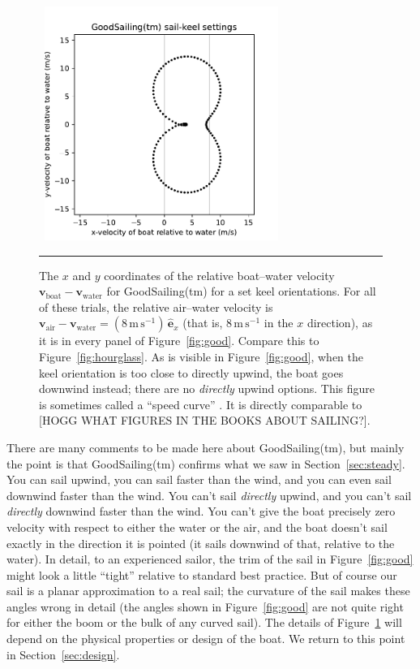 \documentclass[letterpaper]{article}
\renewcommand{\vec}[1]{\boldsymbol{#1}}
\newcommand{\uvec}{\vec{\hat{e}}}
\newcommand{\air}{\text{air}}
\newcommand{\water}{\text{water}}
\newcommand{\boat}{\text{boat}}
\newcommand{\vair}{\vec{v}_\air}
\newcommand{\vwater}{\vec{v}_\water}
\newcommand{\vboat}{\vec{v}_\boat}
\newcommand{\mps}{\mathrm{m\,s^{-1}}}
\newcommand{\secref}[1]{Section~\ref{#1}}
\newcommand{\figref}[1]{Figure~\ref{#1}}
\newcommand{\figurerule}{\rule[1ex]{\textwidth}{0.2pt}}
\begin{document}
\begin{figure}[t!]
  ~\hfill\includegraphics[width=3in]{hourglass-good.pdf}\hfill~
  \caption{The $x$ and $y$ coordinates of the relative boat--water velocity $\vboat-\vwater$ for GoodSailing(tm) for a set keel orientations.
  For all of these trials, the relative air--water velocity is $\vair-\vwater=(8\,\mps)\,\uvec_x$ (that is, $8\,\mps$ in the $x$ direction), as it is in every panel of \figref{fig:good}.
  Compare this to \figref{fig:hourglass}.
  As is visible in \figref{fig:good}, when the keel orientation is too close to directly upwind, the boat goes downwind instead; there are no \emph{directly} upwind options. This figure is sometimes called a ``speed curve'' \cite{pos}. It is directly comparable to [HOGG WHAT FIGURES IN THE BOOKS ABOUT SAILING?].\label{fig:hourgood}}
  \figurerule
\end{figure}

There are many comments to be made here about GoodSailing(tm), but mainly the point is that GoodSailing(tm) confirms what we saw in \secref{sec:steady}.
You can sail upwind, you can sail faster than the wind, and you can even sail downwind faster than the wind.
You can't sail \emph{directly} upwind, and you can't sail \emph{directly} downwind faster than the wind.
You can't give the boat precisely zero velocity with respect to either the water or the air, and the boat doesn't sail exactly in the direction it is pointed (it sails downwind of that, relative to the water).
In detail, to an experienced sailor, the trim of the sail in \figref{fig:good} might look a little ``tight'' relative to standard best practice.
But of course our sail is a planar approximation to a real sail; the curvature of the sail makes these angles wrong in detail (the angles shown in \figref{fig:good} are not quite right for either the boom or the bulk of any curved sail).
The details of \figref{fig:hourgood} will depend on the physical properties or design of the boat.
We return to this point in \secref{sec:design}.
\end{document}

